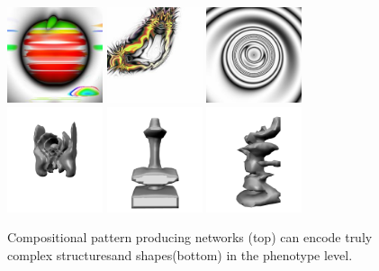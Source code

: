 \begin{figure}[t!]
\centering
\includegraphics[width=0.25\textwidth]{../Figures/Misc/picBreed3.jpg}\quad   
\includegraphics[width=0.25\textwidth]{../Figures/Misc/picBreed2.jpg}\quad
\includegraphics[width=0.25\textwidth]{../Figures/Misc/picBreed1.jpg}\\
\includegraphics[width=0.25\textwidth]{../Figures/Misc/endless2.png}\quad 
\includegraphics[width=0.25\textwidth]{../Figures/Misc/endless1.png}\quad
\includegraphics[width=0.25\textwidth]{../Figures/Misc/endless3.png}
\caption{Compositional pattern producing networks (top) can encode truly complex structures\protect\footnotemark[1] and shapes\protect\footnotemark[2] (bottom) in the phenotype level.}
\label{fig:cppnImages}
\end{figure}

